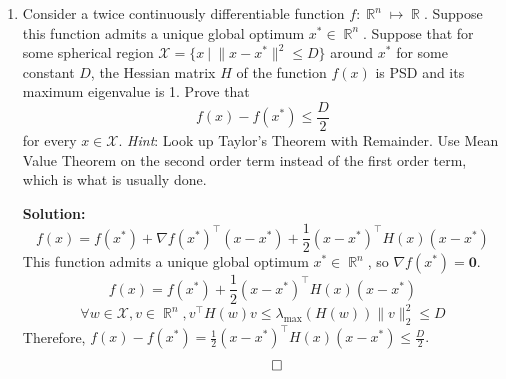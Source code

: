 \documentclass{article}
\DeclareMathOperator{\R}{\mathbb{R}}
\newenvironment{solution}{\color{blue} \smallskip \textbf{Solution:}}{}
\begin{document}
\begin{enumerate}
    \begin{solution}
        \begin{enumerate}
            \item 
            $$
            f'(x) = \frac{1}{x + 1}
            $$
            $$ 
            f''(x) = -\frac{1}{(x + 1)^2}
            $$
            $$
            f'''(x) = \frac{2}{(x + 1)^3}
            $$
            $$
            f(x) \approx x - \frac{x^2}{2} + \frac{x^3}{3}
            $$
        \item 
            $$
            \Gamma(1) = 0! = 1
            $$
            $$
            \psi(1) = \frac{\Gamma'(1)}{\Gamma(1)} = -\gamma
            $$
            $$
            \Gamma'(1) = -\gamma
            $$
            $$
            \Gamma(1.1) = \Gamma(1) + \Gamma'(1) (1.1 - 1) = 1 - 0.1\gamma
            $$
        \end{enumerate}
        \[ \qedhere \]
    \end{solution}

    \item 
    Consider a twice continuously differentiable function $f: \R^{n} \mapsto \R$. 
    Suppose this function admits a unique global optimum $x^* \in \R^n$. 
    Suppose that for some spherical region $\mathcal{X} = \{x \ | \ \|x-x^*\|^2 \leq D\}$ around $x^*$ for some constant $D$, the Hessian matrix $H$ of the function $f(x)$ is PSD and its maximum eigenvalue is 1. 
    Prove that
    \[
        f(x) - f(x^*) \leq \frac{D}{2} 
    \]
    for every $x \in \mathcal{X}$.
    {\em Hint}: Look up Taylor's Theorem with Remainder. 
    Use Mean Value Theorem on the second order term instead of the first order term, which is what is usually done.

    \begin{solution}
        $$
        f(x) = f(x^*) + \nabla f(x^*)^\top(x - x^*)+\frac{1}{2}(x - x^*)^\top H(x) (x - x^*)
        $$
        This function admits a unique global optimum $x^* \in \R^n$, so $\nabla f(x^*) = \mathbf{0}$.
        $$
        f(x) = f(x^*) + \frac{1}{2}(x - x^*)^\top H(x) (x - x^*)
        $$
        $$
        \forall w \in \mathcal{X}, v \in \R^n, v^\top H(w) v \leq \lambda_{\max}(H(w))\|v\|^2_2 \leq D
        $$
        Therefore, $
        f(x) - f(x^*) = \frac{1}{2}(x - x^*)^\top H(x) (x - x^*) \leq \frac{D}{2}.
        $
        \[ \qedhere \]

    \end{solution}

\end{enumerate}
\end{document}
